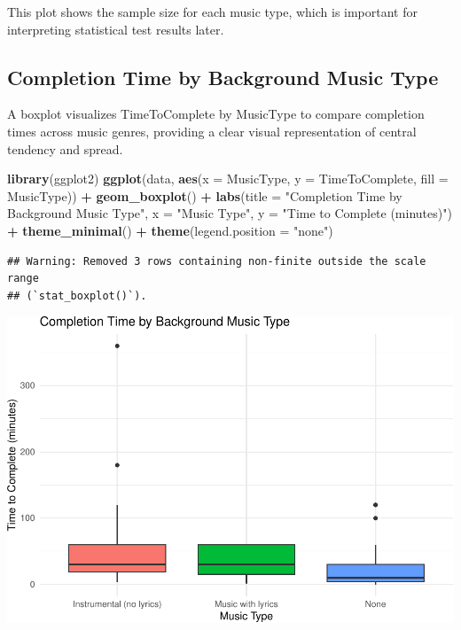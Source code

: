\documentclass[
]{article}
\newenvironment{Shaded}{\begin{snugshade}}{\end{snugshade}}
\newcommand{\AttributeTok}[1]{\textcolor[rgb]{0.13,0.29,0.53}{#1}}
\newcommand{\FunctionTok}[1]{\textcolor[rgb]{0.13,0.29,0.53}{\textbf{#1}}}
\newcommand{\NormalTok}[1]{#1}
\newcommand{\SpecialCharTok}[1]{\textcolor[rgb]{0.81,0.36,0.00}{\textbf{#1}}}
\newcommand{\StringTok}[1]{\textcolor[rgb]{0.31,0.60,0.02}{#1}}
\begin{document}
This plot shows the sample size for each music type, which is important
for interpreting statistical test results later.

\subsection{Completion Time by Background Music
Type}\label{completion-time-by-background-music-type}

A boxplot visualizes TimeToComplete by MusicType to compare completion
times across music genres, providing a clear visual representation of
central tendency and spread.

\begin{Shaded}
\begin{Highlighting}[]
\FunctionTok{library}\NormalTok{(ggplot2)}
\FunctionTok{ggplot}\NormalTok{(data, }\FunctionTok{aes}\NormalTok{(}\AttributeTok{x =}\NormalTok{ MusicType, }\AttributeTok{y =}\NormalTok{ TimeToComplete, }\AttributeTok{fill =}\NormalTok{ MusicType)) }\SpecialCharTok{+}
  \FunctionTok{geom\_boxplot}\NormalTok{() }\SpecialCharTok{+}
  \FunctionTok{labs}\NormalTok{(}\AttributeTok{title =} \StringTok{"Completion Time by Background Music Type"}\NormalTok{,}
       \AttributeTok{x =} \StringTok{"Music Type"}\NormalTok{,}
       \AttributeTok{y =} \StringTok{"Time to Complete (minutes)"}\NormalTok{) }\SpecialCharTok{+}
  \FunctionTok{theme\_minimal}\NormalTok{() }\SpecialCharTok{+}
  \FunctionTok{theme}\NormalTok{(}\AttributeTok{legend.position =} \StringTok{"none"}\NormalTok{)}
\end{Highlighting}
\end{Shaded}

\begin{verbatim}
## Warning: Removed 3 rows containing non-finite outside the scale range
## (`stat_boxplot()`).
\end{verbatim}

\includegraphics{Assignment2_files/figure-latex/unnamed-chunk-2-1.pdf}
\end{document}
